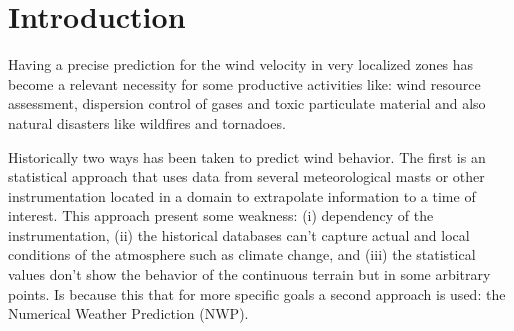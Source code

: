\section{Introduction}
Having a precise prediction for the wind velocity in very localized zones has become a relevant necessity for some productive activities like: wind resource assessment,  dispersion control of gases and toxic particulate material and also natural disasters like wildfires and tornadoes.

Historically two ways has been taken to predict wind behavior. The first is an statistical approach that uses data from several meteorological masts or other instrumentation located in a domain to extrapolate information to a time of interest. This approach present some weakness: (i) dependency of the instrumentation, (ii) the historical databases can't capture actual and local conditions of the atmosphere such as climate change, and (iii) the statistical values don't show the behavior of the continuous terrain but in some arbitrary points. Is because this that for more specific goals a second approach is used: the Numerical Weather Prediction (NWP).

